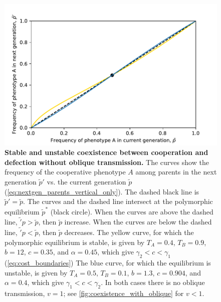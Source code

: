 \documentclass[12pt]{extarticle}
\begin{document}
{%
\begin{figure}[htb]
\centering
\includegraphics{coexistence_without_oblique.pdf}
\caption{\textbf{Stable and unstable coexistence between cooperation and defection without oblique transmission.}
  The curves show the frequency of the cooperative phenotype $A$ among parents in the next generation $\tilde{p}'$ vs. the current generation $\tilde{p}$ (\autoref{eq:nextgen_parents_vertical_only}).
  The dashed black line is $\tilde{p}'=\tilde{p}$.
  The curves and the dashed line intersect at the polymorphic equilibrium $\tilde{p}^*$ (black circle).
  When the curves are above the dashed line, $\tilde'{p}>\tilde{p}$, then $\tilde{p}$ increase.
  When the curves are below the dashed line, $\tilde'{p}<\tilde{p}$, then $\tilde{p}$ decreases.
  The yellow curve, for which the polymorphic equilibrium is stable, is given by $T_A = 0.4$, $T_B = 0.9$, $b = 12$, $c=0.35$, and $\alpha = 0.45$, which give $\gamma_2<c<\gamma_1$ (\autoref{eq:cost_boundaries})
  The blue curve, for which the equilibrium is unstable, is given by $T_A = 0.5$, $T_B = 0.1$, $b = 1.3$, $c=0.904$, and $\alpha = 0.4$, which give $\gamma_1<c<\gamma_2$.
  In both cases there is no oblique transmission, $v=1$; see \autoref{fig:coexistence_with_oblique} for $v<1$.
  }
\label{fig:coexistence_without_oblique}
\end{figure}


\begin{figure}[htb]
  \centering
       

\end{figure}}
\end{document}
